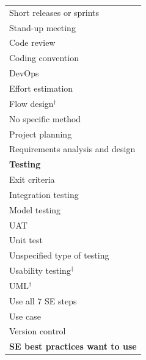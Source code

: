 \documentclass[11pt]{article}
\begin{document}
\begin{longtable}{@{}p{15cm}@{}}
\hspace*{4.5em}Short releases or sprints \\
\hspace*{4.5em}Stand-up meeting \\
\hspace*{3.0em}Code review \\
\hspace*{3.0em}Coding convention \\
\hspace*{3.0em}DevOps \\
\hspace*{3.0em}Effort estimation \\
\hspace*{3.0em}Flow design$^\dagger$ \\
\hspace*{3.0em}No specific method \\
\hspace*{3.0em}Project planning \\
\hspace*{3.0em}Requirements analysis and design \\
\hspace*{3.0em}\textbf{Testing} \\
\hspace*{4.5em}Exit criteria \\
\hspace*{4.5em}Integration testing \\
\hspace*{4.5em}Model testing \\
\hspace*{4.5em}UAT \\
\hspace*{4.5em}Unit test \\
\hspace*{4.5em}Unspecified type of testing \\
\hspace*{4.5em}Usability testing$^\dagger$ \\
\hspace*{3.0em}UML$^\dagger$ \\
\hspace*{3.0em}Use all 7 SE steps \\
\hspace*{3.0em}Use case \\
\hspace*{3.0em}Version control \\
\hspace*{0.0em}\textbf{SE best practices want to use} \\

\end{longtable}
\end{document}
